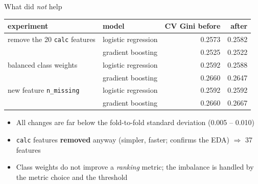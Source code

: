 \documentclass[aspectratio=169,11pt]{beamer}
\newcommand{\feat}[1]{\texttt{\small #1}}   %
\newcommand{\hl}[1]{\textcolor{accent}{\textbf{#1}}}
\begin{document}
\begin{frame}{What did \emph{not} help}
  \centering
  \begin{tabular}{llrr}
    \toprule
    experiment & model & CV Gini before & after \\
    \midrule
    remove the 20 \feat{calc} features & logistic regression & 0.2573 & 0.2582 \\
                                       & gradient boosting   & 0.2525 & 0.2522 \\
    \midrule
    balanced class weights & logistic regression & 0.2592 & 0.2588 \\
                           & gradient boosting   & 0.2660 & 0.2647 \\
    \midrule
    new feature \feat{n\_missing} & logistic regression & 0.2592 & 0.2592 \\
                                  & gradient boosting   & 0.2660 & 0.2667 \\
    \bottomrule
  \end{tabular}

  \vspace{0.5cm}
  \begin{itemize}
    \item All changes are far below the fold-to-fold standard deviation (0.005 -- 0.010)
    \item \feat{calc} features \hl{removed} anyway (simpler, faster; confirms the EDA) $\Rightarrow$ 37 features
    \item Class weights do not improve a \emph{ranking} metric; the imbalance is handled by the metric choice
          and the threshold
  \end{itemize}
\end{frame}
\end{document}
